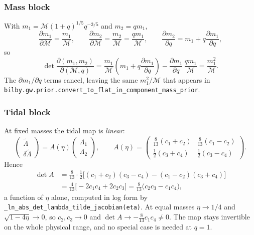 \documentclass[11pt,a4paper]{article}
\newcommand{\Mc}{\mathcal{M}}
\newcommand{\lt}{\tilde{\Lambda}}
\newcommand{\dlt}{\delta\tilde{\Lambda}}
\newcommand{\code}[1]{\texttt{#1}}
\begin{document}
\subsubsection{Mass block}

With $m_1 = \Mc (1+q)^{1/5} q^{-3/5}$ and $m_2 = q m_1$,
\begin{equation}
  \frac{\partial m_1}{\partial \Mc} = \frac{m_1}{\Mc},
  \qquad
  \frac{\partial m_2}{\partial \Mc} = \frac{m_2}{\Mc} = \frac{q m_1}{\Mc},
  \qquad
  \frac{\partial m_2}{\partial q} = m_1 + q \frac{\partial m_1}{\partial q},
\end{equation}
so
\begin{equation}
  \det \frac{\partial(m_1, m_2)}{\partial(\Mc, q)}
  = \frac{m_1}{\Mc}\left( m_1 + q \frac{\partial m_1}{\partial q} \right)
    - \frac{\partial m_1}{\partial q}\, \frac{q m_1}{\Mc}
  = \frac{m_1^2}{\Mc}.
  \label{eq:massjac}
\end{equation}
The $\partial m_1/\partial q$ terms cancel, leaving the same $m_1^2/\Mc$ that
appears in \code{bilby.gw.prior.convert\_to\_flat\_in\_component\_mass\_prior}.

\subsubsection{Tidal block}

At fixed masses the tidal map is \emph{linear}:
\begin{equation}
  \begin{pmatrix} \lt \\ \dlt \end{pmatrix}
  = A(\eta)
  \begin{pmatrix} \Lambda_1 \\ \Lambda_2 \end{pmatrix},
  \qquad
  A(\eta) =
  \begin{pmatrix}
    \tfrac{8}{13}(c_1 + c_2) & \tfrac{8}{13}(c_1 - c_2) \\[1ex]
    \tfrac{1}{2}(c_3 + c_4)  & \tfrac{1}{2}(c_3 - c_4)
  \end{pmatrix}.
\end{equation}
Hence
\begin{align}
  \det A
  &= \tfrac{8}{13}\cdot\tfrac{1}{2}\Big[ (c_1+c_2)(c_3-c_4) - (c_1-c_2)(c_3+c_4) \Big] \nonumber \\
  &= \tfrac{4}{13}\Big[ -2 c_1 c_4 + 2 c_2 c_3 \Big]
   = \frac{8}{13}\big( c_2 c_3 - c_1 c_4 \big),
  \label{eq:tidaljac}
\end{align}
a function of $\eta$ alone, computed in log form by
\code{\_ln\_abs\_det\_lambda\_tilde\_jacobian(eta)}. At equal masses
$\eta \to 1/4$ and $\sqrt{1-4\eta} \to 0$, so $c_2, c_3 \to 0$ and
$\det A \to -\tfrac{8}{13} c_1 c_4 \neq 0$. The map stays invertible on the whole
physical range, and no special case is needed at $q = 1$.
\end{document}
